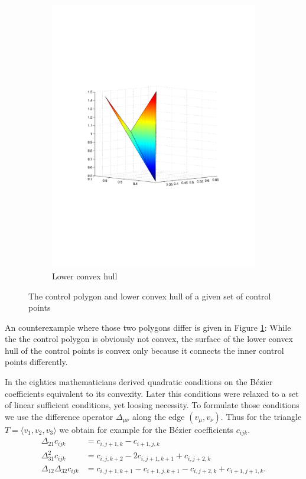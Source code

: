 \begin{figure}[h]
\begin{subfigure}[b]{.5\textwidth}
	\includegraphics[trim=3cm 8cm 3cm 8cm, width=1.\textwidth]{convex_hull2.pdf}
	\caption{Lower convex hull}
\end{subfigure}
\caption{The control polygon and lower convex hull of a given set of control points}
\label{fig: diff connectivity}
\end{figure}
An counterexample where those two polygons differ is given in Figure \ref{fig: diff connectivity}: While the the control polygon is obviously not convex, the surface of the lower convex hull of the control points is convex only because it connects the inner control points differently.

In the eighties mathematicians derived quadratic conditions on the B\'ezier coefficients equivalent to its convexity\cite{CD1984, Dahmen1991}. Later this conditions were relaxed to a set of linear sufficient conditions, yet loosing necessity. To formulate those conditions we use the difference operator $\Delta_{\mu \nu}$ along the edge $(v_\mu, v_\nu)$. 
Thus for the triangle $T=\langle v_1, v_2,v_3 \rangle$ 
we obtain for example for the B\'ezier coefficients $c_{ijk}$.
	\begin{align*}
		\Delta_{21} c_{ijk} &= c_{i,j+1,k} -c_{i+1, j,k}  \\
		\Delta_{31}^2 c_{ijk} &= c_{i,j,k+2} -2c_{i, j+1,k+1} +c_{i, j+2,k} \\
		\Delta_{12} \Delta_{32} c_{ijk} &= c_{i,j+1,k+1} -c_{i+1, j,k+1} - c_{i,j+2,k} +c_{i+1, j+1,k}.
	\end{align*}
 
